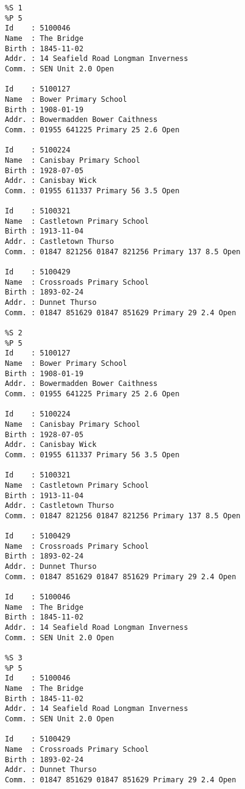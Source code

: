     \begin{verbatim}
      %S 1
      %P 5
      Id    : 5100046
      Name  : The Bridge
      Birth : 1845-11-02
      Addr. : 14 Seafield Road Longman Inverness
      Comm. : SEN Unit 2.0 Open

      Id    : 5100127
      Name  : Bower Primary School
      Birth : 1908-01-19
      Addr. : Bowermadden Bower Caithness
      Comm. : 01955 641225 Primary 25 2.6 Open

      Id    : 5100224
      Name  : Canisbay Primary School
      Birth : 1928-07-05
      Addr. : Canisbay Wick
      Comm. : 01955 611337 Primary 56 3.5 Open

      Id    : 5100321
      Name  : Castletown Primary School
      Birth : 1913-11-04
      Addr. : Castletown Thurso
      Comm. : 01847 821256 01847 821256 Primary 137 8.5 Open

      Id    : 5100429
      Name  : Crossroads Primary School
      Birth : 1893-02-24
      Addr. : Dunnet Thurso
      Comm. : 01847 851629 01847 851629 Primary 29 2.4 Open

      %S 2
      %P 5
      Id    : 5100127
      Name  : Bower Primary School
      Birth : 1908-01-19
      Addr. : Bowermadden Bower Caithness
      Comm. : 01955 641225 Primary 25 2.6 Open

      Id    : 5100224
      Name  : Canisbay Primary School
      Birth : 1928-07-05
      Addr. : Canisbay Wick
      Comm. : 01955 611337 Primary 56 3.5 Open

      Id    : 5100321
      Name  : Castletown Primary School
      Birth : 1913-11-04
      Addr. : Castletown Thurso
      Comm. : 01847 821256 01847 821256 Primary 137 8.5 Open

      Id    : 5100429
      Name  : Crossroads Primary School
      Birth : 1893-02-24
      Addr. : Dunnet Thurso
      Comm. : 01847 851629 01847 851629 Primary 29 2.4 Open

      Id    : 5100046
      Name  : The Bridge
      Birth : 1845-11-02
      Addr. : 14 Seafield Road Longman Inverness
      Comm. : SEN Unit 2.0 Open

      %S 3
      %P 5
      Id    : 5100046
      Name  : The Bridge
      Birth : 1845-11-02
      Addr. : 14 Seafield Road Longman Inverness
      Comm. : SEN Unit 2.0 Open

      Id    : 5100429
      Name  : Crossroads Primary School
      Birth : 1893-02-24
      Addr. : Dunnet Thurso
      Comm. : 01847 851629 01847 851629 Primary 29 2.4 Open


\end{verbatim}

